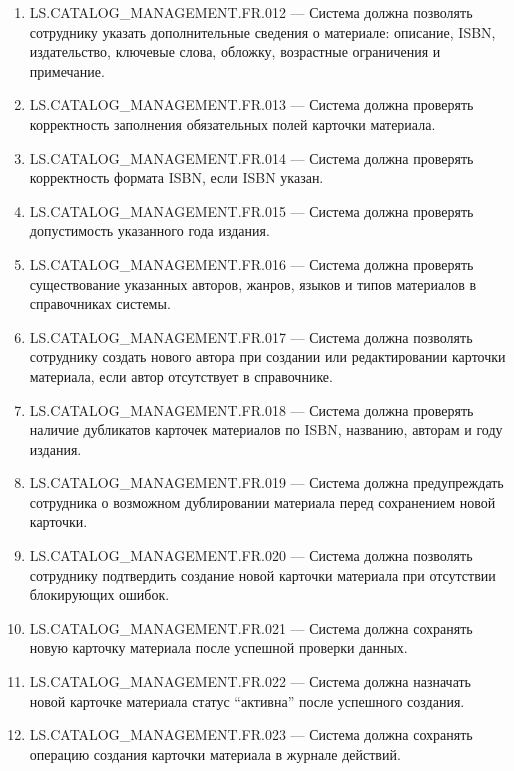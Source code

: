 \documentclass[12pt,a4paper]{article}
\begin{document}
\begin{enumerate}
		\item LS.CATALOG\_MANAGEMENT.FR.012 --- Система должна позволять сотруднику
		указать дополнительные сведения о материале: описание, ISBN, издательство,
		ключевые слова, обложку, возрастные ограничения и примечание.
		
		\item LS.CATALOG\_MANAGEMENT.FR.013 --- Система должна проверять корректность
		заполнения обязательных полей карточки материала.
		
		\item LS.CATALOG\_MANAGEMENT.FR.014 --- Система должна проверять корректность
		формата ISBN, если ISBN указан.
		
		\item LS.CATALOG\_MANAGEMENT.FR.015 --- Система должна проверять допустимость
		указанного года издания.
		
		\item LS.CATALOG\_MANAGEMENT.FR.016 --- Система должна проверять существование
		указанных авторов, жанров, языков и типов материалов в справочниках системы.
		
		\item LS.CATALOG\_MANAGEMENT.FR.017 --- Система должна позволять сотруднику
		создать нового автора при создании или редактировании карточки материала, если
		автор отсутствует в справочнике.
		
		\item LS.CATALOG\_MANAGEMENT.FR.018 --- Система должна проверять наличие
		дубликатов карточек материалов по ISBN, названию, авторам и году издания.
		
		\item LS.CATALOG\_MANAGEMENT.FR.019 --- Система должна предупреждать сотрудника
		о возможном дублировании материала перед сохранением новой карточки.
		
		\item LS.CATALOG\_MANAGEMENT.FR.020 --- Система должна позволять сотруднику
		подтвердить создание новой карточки материала при отсутствии блокирующих ошибок.
		
		\item LS.CATALOG\_MANAGEMENT.FR.021 --- Система должна сохранять новую карточку
		материала после успешной проверки данных.
		
		\item LS.CATALOG\_MANAGEMENT.FR.022 --- Система должна назначать новой карточке
		материала статус ``активна'' после успешного создания.
		
		\item LS.CATALOG\_MANAGEMENT.FR.023 --- Система должна сохранять операцию
		создания карточки материала в журнале действий.
		

\end{enumerate}
\end{document}

